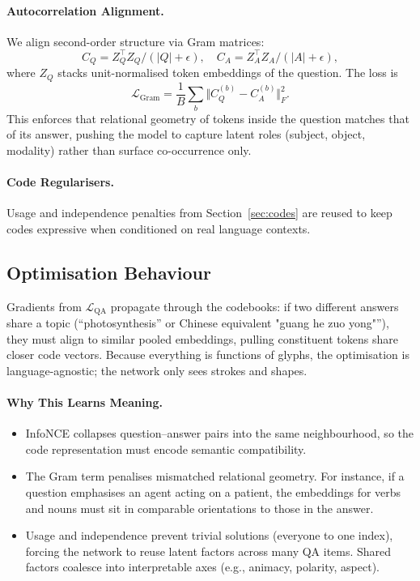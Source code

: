\documentclass[11pt]{article}
\begin{document}
\paragraph{Autocorrelation Alignment.}
We align second-order structure via Gram matrices:
\begin{equation}
    C_Q = Z_Q^\top Z_Q/(|Q|+\epsilon), \quad C_A = Z_A^\top Z_A/(|A|+\epsilon),
\end{equation}
where $Z_Q$ stacks unit-normalised token embeddings of the question. The loss is
\begin{equation}
    \mathcal{L}_{\text{Gram}} = \frac{1}{B}\sum_b \Vert C_Q^{(b)} - C_A^{(b)}\Vert_F^2.
\end{equation}
This enforces that relational geometry of tokens inside the question matches that of its answer, pushing the model to capture latent roles (subject, object, modality) rather than surface co-occurrence only.

\paragraph{Code Regularisers.}
Usage and independence penalties from Section~\ref{sec:codes} are reused to keep codes expressive when conditioned on real language contexts.

\subsection{Optimisation Behaviour}
Gradients from $\mathcal{L}_{\text{QA}}$ propagate through the codebooks: if two different answers share a topic (``photosynthesis'' or Chinese equivalent "guang he zuo yong"''), they must align to similar pooled embeddings, pulling constituent tokens share closer code vectors. Because everything is functions of glyphs, the optimisation is language-agnostic; the network only sees strokes and shapes.

\paragraph{Why This Learns Meaning.}
\begin{itemize}
    \item InfoNCE collapses question--answer pairs into the same neighbourhood, so the code representation must encode semantic compatibility.
    \item The Gram term penalises mismatched relational geometry. For instance, if a question emphasises an agent acting on a patient, the embeddings for verbs and nouns must sit in comparable orientations to those in the answer.
    \item Usage and independence prevent trivial solutions (everyone to one index), forcing the network to reuse latent factors across many QA items. Shared factors coalesce into interpretable axes (e.g., animacy, polarity, aspect).
\end{itemize}
\end{document}
